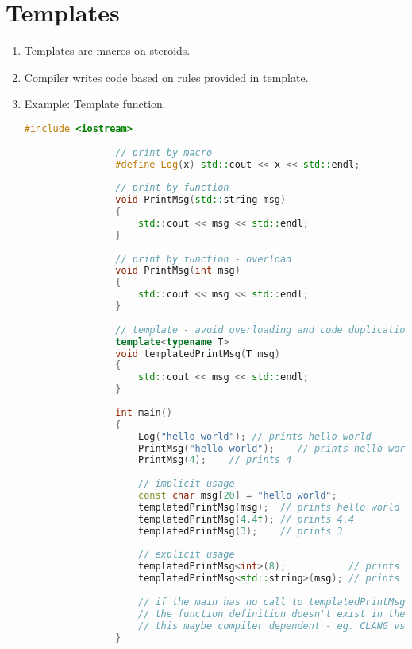 \documentclass{article}
\begin{document}
\section{Templates}
    \begin{enumerate}
        \item Templates are macros on steroids.
        \item Compiler writes code based on rules provided in template.
        \item Example: Template function.
            \begin{lstlisting}[language=C++, caption=Template function example]
                #include <iostream>
                
                // print by macro
                #define Log(x) std::cout << x << std::endl;
                
                // print by function
                void PrintMsg(std::string msg)
                {
                	std::cout << msg << std::endl;
                }
                
                // print by function - overload
                void PrintMsg(int msg)
                {
                	std::cout << msg << std::endl;
                }
                
                // template - avoid overloading and code duplication by using single function
                template<typename T>
                void templatedPrintMsg(T msg)
                {
                	std::cout << msg << std::endl;
                }
                
                int main()
                {
                	Log("hello world"); // prints hello world
                	PrintMsg("hello world");	// prints hello world
                	PrintMsg(4);	// prints 4
                	
                	// implicit usage
                	const char msg[20] = "hello world";
                	templatedPrintMsg(msg);	 // prints hello world
                	templatedPrintMsg(4.4f); // prints 4.4
                	templatedPrintMsg(3);	 // prints 3
                
                	// explicit usage
                	templatedPrintMsg<int>(8);			 // prints 8
                	templatedPrintMsg<std::string>(msg); // prints hello world
                
                	// if the main has no call to templatedPrintMsg, 
                	// the function definition doesn't exist in the code
                	// this maybe compiler dependent - eg. CLANG vs MSCV
                }
            \end{lstlisting}
            

\end{enumerate}
\end{document}
